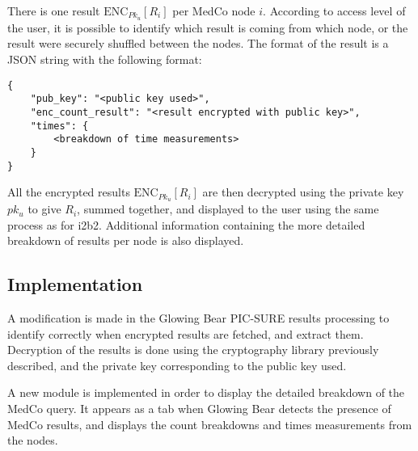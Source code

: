There is one result $\text{ENC}_{Pk_u}[R_i]$ per MedCo node $i$.
According to access level of the user, it is possible to identify which result is coming from which node, or the result were securely shuffled between the nodes.
The format of the result is a JSON string with the following format:

\begin{verbatim}
{
    "pub_key": "<public key used>",
    "enc_count_result": "<result encrypted with public key>",
    "times": {
        <breakdown of time measurements>
    }
}    
\end{verbatim}

All the encrypted results $\text{ENC}_{Pk_u}[R_i]$ are then decrypted using the private key $pk_u$ to give $R_i$, summed together, and displayed to the user using the same process as for i2b2.
Additional information containing the more detailed breakdown of results per node is also displayed.


\subsection{Implementation}

A modification is made in the Glowing Bear PIC-SURE results processing to identify correctly when encrypted results are fetched, and extract them.
Decryption of the results is done using the cryptography library previously described, and the private key corresponding to the public key used.

A new module is implemented in order to display the detailed breakdown of the MedCo query.
It appears as a tab when Glowing Bear detects the presence of MedCo results, and displays the count breakdowns and times measurements from the nodes.
